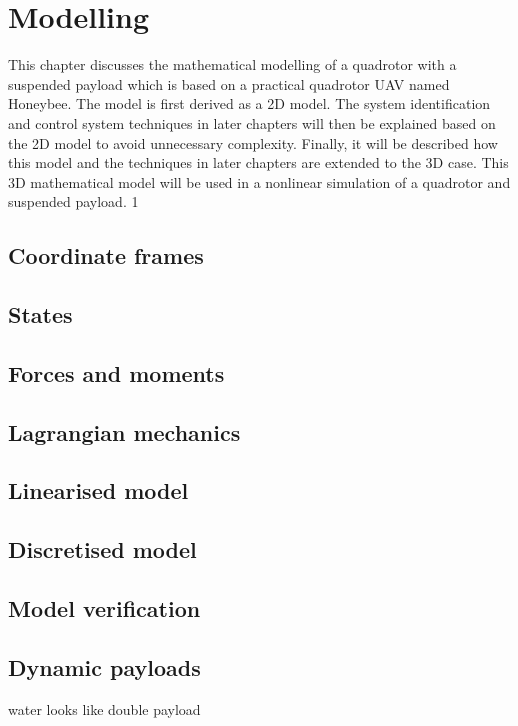 \graphicspath{{modelling/fig/}}

\chapter{Modelling}
\label{chap:modelling}

This chapter discusses the mathematical modelling of a quadrotor with a suspended
payload which is based on a practical quadrotor UAV named Honeybee.
The model is first derived as a 2D model.
The system identification and control system techniques in later chapters will then be explained based on the 2D model to avoid unnecessary complexity.
Finally, it will be described how this model and the techniques in later chapters are extended to the 3D case.
This 3D mathematical model will be used in a nonlinear simulation of a quadrotor and suspended payload.
1
\section{Coordinate frames}
\section{States}
\section{Forces and moments}
\section{Lagrangian mechanics}
\section{Linearised model}
    \label{sec:linear_model}

\section{Discretised model}
\section{Model verification}
\section{Dynamic payloads}
water looks like double payload

